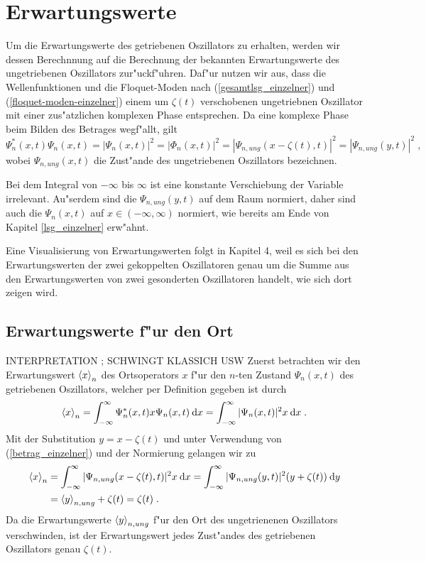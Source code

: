 \section{Erwartungswerte}
  Um die Erwartungswerte des getriebenen Oszillators zu erhalten, werden wir dessen Berechnnung auf die Berechnung der bekannten Erwartungswerte des ungetriebenen Oszillators zur"uckf"uhren.
  Daf"ur nutzen wir aus, dass die Wellenfunktionen und die Floquet-Moden nach (\ref{gesamtlsg_einzelner}) und (\ref{floquet-moden-einzelner}) einem um $\zeta(t)$ verschobenen ungetriebnen Oszillator mit einer zus"atzlichen komplexen Phase entsprechen.
  Da eine komplexe Phase beim Bilden des Betrages wegf"allt, gilt
  \begin{equation}
    \Psi_n^*(x,t)\Psi_n(x,t) = |\Psi_n(x,t)|^2 = |\Phi_n(x,t)|^2 = |\Psi_{n,ung}(x-\zeta(t),t)|^2 = |\Psi_{n,ung}(y,t)|^2 \; ,
    \label{betrag_einzelner}
  \end{equation}
  wobei $\Psi_{n,ung}(x,t)$ die Zust"ande des ungetriebenen Oszillators bezeichnen.

  Bei dem Integral von $-\infty$ bis $\infty$ ist eine konstante Verschiebung der Variable irrelevant.
  Au"serdem sind die $\Psi_{n,ung}(y,t)$ auf dem Raum normiert, daher sind auch die $\Psi_n(x,t)$ auf $x \in (-\infty,\infty)$ normiert, wie bereits am Ende von Kapitel \ref{lsg_einzelner} erw"ahnt.

  Eine Visualisierung von Erwartungswerten folgt in Kapitel 4, weil es sich bei den Erwartungswerten der zwei gekoppelten Oszillatoren genau um die Summe aus den Erwartungswerten von zwei gesonderten Oszillatoren handelt, wie sich dort zeigen wird.

  \subsection{Erwartungswerte f"ur den Ort}
  INTERPRETATION ; SCHWINGT KLASSICH USW
    Zuerst betrachten wir den Erwartungswert $\braket{x}_n$ des Ortsoperators $x$ f"ur den $n$-ten Zustand $\Psi_n(x,t)$ des getriebenen Oszillators, welcher per Definition gegeben ist durch
    \begin{equation}
      \braket{x}_n = \int_{-\infty}^{\infty} \Psi_n^*(x,t)x\Psi_n(x,t) \: \text dx
      = \int_{-\infty}^{\infty} |\Psi_n(x,t)|^2 x \: \text dx \; .
    \end{equation}
    Mit der Substitution $y=x-\zeta(t)$ und unter Verwendung von (\ref{betrag_einzelner}) und der Normierung gelangen wir zu
    \begin{align}
      \begin{split}
        \braket{x}_n &= \int_{-\infty}^{\infty} |\Psi_{n,ung}(x-\zeta(t),t)|^2 x \: \text dx
        = \int_{-\infty}^{\infty} |\Psi_{n,ung}(y,t)|^2 (y+\zeta(t)) \: \text dy \\
        &= \braket{y}_{n,ung} + \zeta(t) = \zeta(t) \; .
      \end{split}
    \end{align}
    Da die Erwartungswerte $\braket{y}_{n,ung}$ f"ur den Ort des ungetrienenen Oszillators verschwinden, ist der Erwartungswert jedes Zust"andes des getriebenen Oszillators genau $\zeta(t)$.

